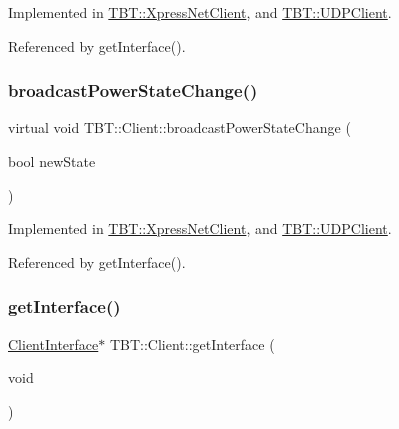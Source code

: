 Implemented in \hyperlink{classTBT_1_1XpressNetClient_a0ef986da287d7fbfea163ae6016a7154_a0ef986da287d7fbfea163ae6016a7154}{T\+B\+T\+::\+Xpress\+Net\+Client}, and \hyperlink{classTBT_1_1UDPClient_a90c650259501f341f531ede72210624a_a90c650259501f341f531ede72210624a}{T\+B\+T\+::\+U\+D\+P\+Client}.



Referenced by get\+Interface().

\mbox{\label{classTBT_1_1Client_ad64588b494ec98154ea261ed4f3b3643_ad64588b494ec98154ea261ed4f3b3643}} 
\subsubsection{\texorpdfstring{broadcast\+Power\+State\+Change()}{broadcastPowerStateChange()}}
{\footnotesize\ttfamily virtual void T\+B\+T\+::\+Client\+::broadcast\+Power\+State\+Change (\begin{DoxyParamCaption}\item[{bool}]{new\+State }\end{DoxyParamCaption})\hspace{0.3cm}{\ttfamily [pure virtual]}}



Implemented in \hyperlink{classTBT_1_1XpressNetClient_a6f104050aad16ef336a6b83d2c60550a_a6f104050aad16ef336a6b83d2c60550a}{T\+B\+T\+::\+Xpress\+Net\+Client}, and \hyperlink{classTBT_1_1UDPClient_aafe098769858c054b025bf3b3ccacf30_aafe098769858c054b025bf3b3ccacf30}{T\+B\+T\+::\+U\+D\+P\+Client}.



Referenced by get\+Interface().

\mbox{\label{classTBT_1_1Client_a37d9a9919aa90879dbf46cf95e519259_a37d9a9919aa90879dbf46cf95e519259}} 
\subsubsection{\texorpdfstring{get\+Interface()}{getInterface()}}
{\footnotesize\ttfamily \hyperlink{classTBT_1_1ClientInterface}{Client\+Interface}$\ast$ T\+B\+T\+::\+Client\+::get\+Interface (\begin{DoxyParamCaption}\item[{void}]{ }\end{DoxyParamCaption})\hspace{0.3cm}{\ttfamily [inline]}}



